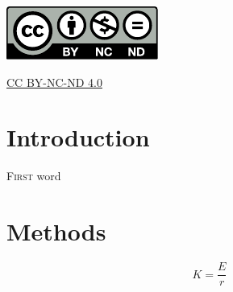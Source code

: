 \documentclass[12pt]{extarticle}
\begin{document}
\begin{centering}
	
\vfill

\includegraphics[scale=0.5]{by-nc-nd} \vspace{-0.8em}

\footnotesize
\href{commons-link}{CC BY-NC-ND 4.0}

\vfill

\end{centering}


\newpage

\section{Introduction}

\lettrine[lines=3,lraise=0.1, nindent=0em]{F}{irst} word \lipsum[1]


\lipsum[1]

\section{Methods}
\lipsum[1]

\begin{equation}
K = \frac{E}{r}
\end{equation}
\end{document}
